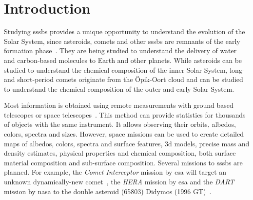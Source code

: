 \section{Introduction} \label{sec:introduction}




Studying \glspl{sssb} provides a unique opportunity to understand the evolution of the Solar System, since asteroids, comets and other \glspl{sssb} are remnants of the early formation phase~\cite{walsh2018rubble, a2017comets}. They are being studied to understand the delivery of water and carbon-based molecules to Earth and other planets. While asteroids can be studied to understand the chemical composition of the inner Solar System, long- and short-period comets originate from the \"Opik-Oort cloud and can be studied to understand the chemical composition of the outer and early Solar System.

Most information is obtained using remote measurements with ground based telescopes or space telescopes~\cite{bowles2018castaway}. This method can provide statistics for thousands of objects with the same instrument. It allows observing their orbits, albedos, colors, spectra and sizes. However, space missions can be used to create detailed maps of albedos, colors, spectra and surface features, \gls{3d} models, precise mass and density estimates, physical properties and chemical composition, both surface material composition and sub-surface composition. Several missions to \glspl{sssb} are planned. For example, the \textit{Comet Interceptor} mission by \gls{esa} will target an unknown dynamically-new comet~\cite{snodgrass2019europeanCI}, the \textit{HERA} mission by \gls{esa} and the \textit{DART} mission by \gls{nasa} to the double asteroid (65803) Didymos (1996 GT)~\cite{hera, talbert_2017DART}.

